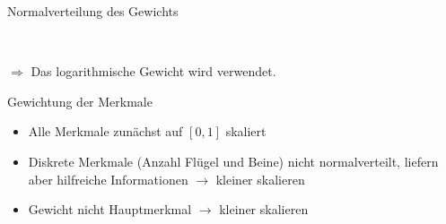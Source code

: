 \documentclass{beamer}
\begin{document}
\begin{frame}{Normalverteilung des Gewichts}
 \centering
 \begin{figure}
  ~
  ~
 \end{figure}
 $\Rightarrow$ Das logarithmische Gewicht wird verwendet.
\end{frame}

\begin{frame}{Gewichtung der Merkmale}
 \begin{itemize}
  \item Alle Merkmale zunächst auf $[0, 1]$ skaliert
  \item Diskrete Merkmale (Anzahl Flügel und Beine) nicht normalverteilt, liefern aber hilfreiche Informationen $\rightarrow$ kleiner skalieren
  \item Gewicht nicht Hauptmerkmal $\rightarrow$ kleiner skalieren
 \end{itemize}
\end{frame}
\end{document}

